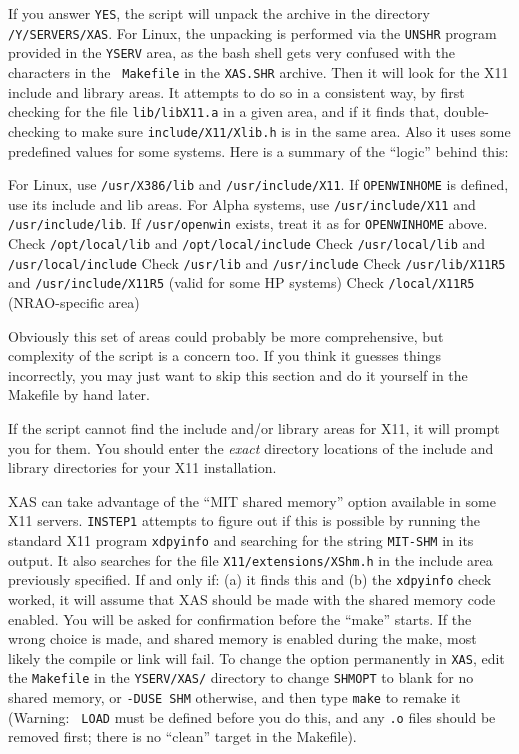 If you answer {\tt YES}, the script will unpack the archive in the
directory {\tt\thisver/Y/SER\-VERS/XAS}.  For Linux, the unpacking is
performed via the {\tt UNSHR} program provided in the {\tt YSERV} area, as
the bash shell gets very confused with the characters in the {\tt
Makefile} in the {\tt XAS.SHR} archive.  Then it will look for the X11
include and library areas.  It attempts to do so in a consistent way, by
first checking for the file {\tt lib/libX11.a} in a given area, and if it
finds that, double-checking to make sure {\tt include/X11/Xlib.h} is in
the same area.  Also it uses some predefined values for some systems.
Here is a summary of the ``logic'' behind this:\medskip

{\ndot For Linux, use {\tt /usr/X386/lib} and {\tt /usr/include/X11}.}
{\ndot If {\tt\dol OPENWINHOME} is defined, use its include and lib areas.}
{\ndot For Alpha systems, use {\tt /usr/include/X11} and {\tt
        /usr/include/lib}.}
{\ndot If {\tt /usr/openwin} exists, treat it as for {\tt\dol OPENWINHOME}
        above.}
{\ndot Check {\tt /opt/local/lib} and {\tt /opt/local/include}}
{\ndot Check {\tt /usr/local/lib} and {\tt /usr/local/include}}
{\ndot Check {\tt /usr/lib} and {\tt /usr/include}}
{\ndot Check {\tt /usr/lib/X11R5} and {\tt /usr/include/X11R5} (valid
        for some HP systems)}
{\ndot Check {\tt /local/X11R5} (NRAO-specific area)\medskip}

\medskip\noindent Obviously this set of areas could probably be more
comprehensive, but complexity of the script is a concern too.  If you
think it guesses things incorrectly, you may just want to skip this
section and do it yourself in the Makefile by hand later.

If the script cannot find the include and/or library areas for X11, it
will prompt you for them.  You should enter the {\it exact} directory
locations of the include and library directories for your X11
installation.

XAS can take advantage of the ``MIT shared memory'' option available in
some X11 servers.  {\tt INSTEP1} attempts to figure out if this is
possible by running the standard X11 program {\tt xdpyinfo} and searching
for the string {\tt MIT-SHM} in its output.  It also searches for the file
{\tt X11/extensions/XShm.h} in the include area previously specified.  If
and only if: (a) it finds this and (b) the {\tt xdpyinfo} check worked, it
will assume that XAS should be made with the shared memory code enabled.
You will be asked for confirmation before the ``make'' starts.  If the
wrong choice is made, and shared memory is enabled during the make, most
likely the compile or link will fail.  To change the option permanently in
{\tt XAS}, edit the {\tt Makefile} in the {\tt\dol YSERV/XAS/} directory
to change {\tt SHMOPT} to blank for no shared memory, or {\tt -DUSE
SHM} otherwise, and then type {\tt make} to remake it (Warning: {\tt\dol
LOAD} must be defined before you do this, and any {\tt *.o} files should
be removed first; there is no ``clean'' target in the Makefile).

